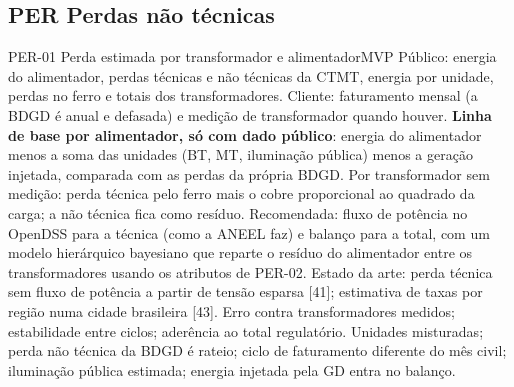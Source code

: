 \subsection{PER \textperiodcentered{} Perdas não técnicas}

\begin{ficha}{PER-01 \textperiodcentered{} Perda estimada por transformador e alimentador}{MVP}
 Público: energia do alimentador, perdas técnicas e não técnicas
da CTMT, energia por unidade, perdas no ferro e totais dos transformadores.
Cliente: faturamento mensal (a BDGD é anual e defasada) e medição de
transformador quando houver.
 \textbf{Linha de base por alimentador, só com dado
público}: energia do alimentador menos a soma das unidades (BT, MT,
iluminação pública) menos a geração injetada, comparada com as perdas da
própria BDGD. Por transformador sem medição: perda técnica pelo ferro mais o
cobre proporcional ao quadrado da carga; a não técnica fica como resíduo.
Recomendada: fluxo de potência no OpenDSS para a técnica (como a ANEEL faz)
e balanço para a total, com um modelo hierárquico bayesiano que reparte o
resíduo do alimentador entre os transformadores usando os atributos de
PER-02. Estado da arte: perda técnica sem fluxo de potência a partir de
tensão esparsa [41]; estimativa de taxas por região numa cidade brasileira
[43].
 Erro contra transformadores medidos; estabilidade entre
ciclos; aderência ao total regulatório.
 Unidades misturadas; perda não técnica da BDGD é rateio;
ciclo de faturamento diferente do mês civil; iluminação pública estimada;
energia injetada pela GD entra no balanço.
\end{ficha}

